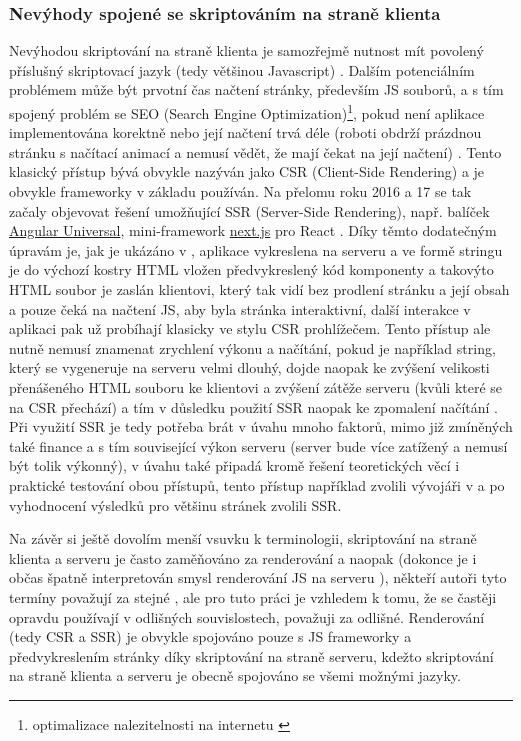         \subsubsection*{Nevýhody spojené se skriptováním na straně klienta}
        Nevýhodou skriptování na straně klienta je samozřejmě nutnost mít povolený příslušný skriptovací jazyk (tedy většinou Javascript) \cite{scripting-sqa}. Dalším potenciálním problémem může být prvotní čas načtení stránky, především JS souborů, a s tím spojený problém se SEO (Search Engine Optimization)\footnote{optimalizace nalezitelnosti na internetu \cite{seo}}, pokud není aplikace implementována korektně nebo její načtení trvá déle (roboti obdrží prázdnou stránku s načítací animací a nemusí vědět, že mají čekat na její načtení) \cite{scripting-freecodecamp}\cite{scripting-hackernoon}. Tento klasický přístup bývá obvykle nazýván jako CSR (Client-Side Rendering) a je obvykle frameworky v základu používán. Na přelomu roku 2016 a 17 se tak začaly objevovat řešení umožňující SSR (Server-Side Rendering), např. balíček \href{https://github.com/angular/universal}{Angular Universal}, mini-framework \href{https://github.com/zeit/next.js/}{next.js} pro React \cite{scripting-hackernoon}. Díky těmto dodatečným úpravám je, jak je ukázáno v \cite{scripting-ytb}, aplikace vykreslena na serveru a ve formě stringu je do výchozí kostry HTML vložen předvykreslený kód komponenty a takovýto HTML soubor je zaslán klientovi, který tak vidí bez prodlení stránku a její obsah a pouze čeká na načtení JS, aby byla stránka interaktivní, další interakce v aplikaci pak už probíhají klasicky ve stylu CSR prohlížečem. Tento přístup ale nutně nemusí znamenat zrychlení výkonu a načítání, pokud je například string, který se vygeneruje na serveru velmi dlouhý, dojde naopak ke zvýšení velikosti přenášeného HTML souboru ke klientovi a zvýšení zátěže serveru (kvůli které se na CSR přechází) a tím v důsledku použití SSR naopak ke zpomalení načítání \cite{scripting-hackernoon}. Při využití SSR je tedy potřeba brát v úvahu mnoho faktorů, mimo již zmíněných také finance a s tím související výkon serveru (server bude více zatížený a nemusí být tolik výkonný), v úvahu také připadá kromě řešení teoretických věcí i praktické testování obou přístupů, tento přístup například zvolili vývojáři v \cite{scripting-benchmark} a po vyhodnocení výsledků pro většinu stránek zvolili SSR.
        
        Na závěr si ještě dovolím menší vsuvku k terminologii, skriptování na straně klienta a serveru je často zaměňováno za renderování a naopak (dokonce je i občas špatně interpretován smysl renderování JS na serveru \cite{scripting-chyby}), někteří autoři tyto termíny považují za stejné \cite{scripting-freecodecamp}, ale pro tuto práci je vzhledem k tomu, že se častěji opravdu používají v odlišných souvislostech, považuji za odlišné. Renderování (tedy CSR a SSR) je obvykle spojováno pouze s JS frameworky a předvykreslením stránky díky skriptování na straně serveru, kdežto skriptování na straně klienta a serveru je obecně spojováno se všemi možnými jazyky.
    
